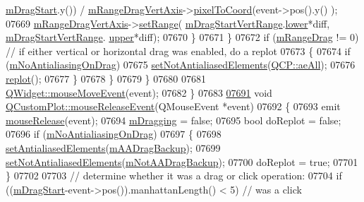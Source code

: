 \begin{DoxyCode}
      \hyperlink{a00116_a23a3ce3b031eef6349252229446f3665}{mDragStart}.y()) / \hyperlink{a00116_a13364bbe1871cc2810ebd8946e30cc49}{mRangeDragVertAxis}->\hyperlink{a00025_ae9289ef7043b9d966af88eaa95b037d1}{pixelToCoord}(event->pos().y()
      );
07669           \hyperlink{a00116_a13364bbe1871cc2810ebd8946e30cc49}{mRangeDragVertAxis}->\hyperlink{a00025_a57d6ee9e9009fe88cb19db476ec70bca}{setRange}(
      \hyperlink{a00116_aebb85632771d08a771605ccc5e0e0622}{mDragStartVertRange}.\hyperlink{a00049_aa3aca3edb14f7ca0c85d912647b91745}{lower}*diff, \hyperlink{a00116_aebb85632771d08a771605ccc5e0e0622}{mDragStartVertRange}.
      \hyperlink{a00049_ae44eb3aafe1d0e2ed34b499b6d2e074f}{upper}*diff);
07670         \}
07671       \}
07672       \textcolor{keywordflow}{if} (\hyperlink{a00116_a8cc4277431ae5ab8e15cf2dfe5c17e1c}{mRangeDrag} != 0) \textcolor{comment}{// if either vertical or horizontal drag was enabled, do a replot}
07673       \{
07674         \textcolor{keywordflow}{if} (\hyperlink{a00116_abfc5e49800e5ca84fa6312b9bb814b3b}{mNoAntialiasingOnDrag})
07675           \hyperlink{a00116_ae10d685b5eabea2999fb8775ca173c24}{setNotAntialiasedElements}(\hyperlink{a00143_ae55dbe315d41fe80f29ba88100843a0caa897c232a0ffc8368e7c100ffc59ef31}{QCP::aeAll});
07676         \hyperlink{a00116_a563540b54b2a09c8ef092d42e9621f42}{replot}();
07677       \}
07678     \}
07679   \}
07680   
07681   \hyperlink{a00116_ac64727a4f442770f6e5e6be2d0530843}{QWidget::mouseMoveEvent}(event);
07682 \}
07683 
\hypertarget{a00115_source_l07691}{}\hyperlink{a00116_a724e97d2e8c03e68adac5f4b6164a1b3}{07691} \textcolor{keywordtype}{void} \hyperlink{a00116_a724e97d2e8c03e68adac5f4b6164a1b3}{QCustomPlot::mouseReleaseEvent}(QMouseEvent *event)
07692 \{
07693   emit \hyperlink{a00116_ac8dc0ee6bb98e923c00b4ebafbe6134d}{mouseRelease}(event);
07694   \hyperlink{a00116_ad1273fad7e12b0f61819343368778928}{mDragging} = \textcolor{keyword}{false};
07695   \textcolor{keywordtype}{bool} doReplot = \textcolor{keyword}{false};
07696   \textcolor{keywordflow}{if} (\hyperlink{a00116_abfc5e49800e5ca84fa6312b9bb814b3b}{mNoAntialiasingOnDrag})
07697   \{
07698     \hyperlink{a00116_af6f91e5eab1be85f67c556e98c3745e8}{setAntialiasedElements}(\hyperlink{a00116_ac6e9f4d75a28eb37ee454e1907655e8b}{mAADragBackup});
07699     \hyperlink{a00116_ae10d685b5eabea2999fb8775ca173c24}{setNotAntialiasedElements}(\hyperlink{a00116_aac79a49a340f3e5b06465bb730431013}{mNotAADragBackup});
07700     doReplot = \textcolor{keyword}{true};
07701   \}
07702   
07703   \textcolor{comment}{// determine whether it was a drag or click operation:}
07704   \textcolor{keywordflow}{if} ((\hyperlink{a00116_a23a3ce3b031eef6349252229446f3665}{mDragStart}-event->pos()).manhattanLength() < 5) \textcolor{comment}{// was a click}

\end{DoxyCode}

